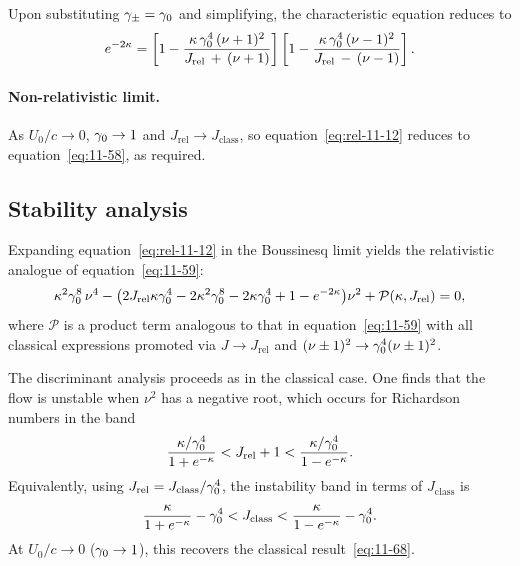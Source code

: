 Upon substituting $\gamma_{\pm}=\gamma_{0}$ and simplifying, the
characteristic equation reduces to
\begin{equation}
\label{eq:rel-11-12}
e^{-2\kappa}
= \left[1
  -\frac{\kappa\,\gamma_{0}^{4}\,(\nu+1)^{2}}
    {J_{\mathrm{rel}}\,+\,(\nu+1)}
\right]
\left[1
  -\frac{\kappa\,\gamma_{0}^{4}\,(\nu-1)^{2}}
    {J_{\mathrm{rel}}\,-\,(\nu-1)}
\right].
\end{equation}

\paragraph{Non-relativistic limit.}
As $U_{0}/c\to 0$, $\gamma_{0}\to 1$ and $J_{\mathrm{rel}}\to
J_{\mathrm{class}}$, so equation~\eqref{eq:rel-11-12} reduces to
equation~\eqref{eq:11-58}, as required.

\subsection{Stability analysis}

Expanding equation~\eqref{eq:rel-11-12} in the Boussinesq limit yields the
relativistic analogue of equation~\eqref{eq:11-59}:
\begin{equation}
\label{eq:rel-11-13}
\kappa^{2}\gamma_{0}^{8}\,\nu^{4}
- \bigl(2J_{\mathrm{rel}}\kappa\gamma_{0}^{4}
  -2\kappa^{2}\gamma_{0}^{8}-2\kappa\gamma_{0}^{4}
  +1-e^{-2\kappa}\bigr)\nu^{2}
+ \mathcal{P}(\kappa,J_{\mathrm{rel}})
= 0,
\end{equation}
where $\mathcal{P}$ is a product term analogous to that in
equation~\eqref{eq:11-59} with all classical expressions promoted via
$J\to J_{\mathrm{rel}}$ and $(\nu\pm 1)^{2}\to\gamma_{0}^{4}(\nu\pm 1)^{2}$.

The discriminant analysis proceeds as in the classical case.  One finds
that the flow is unstable when $\nu^{2}$ has a negative root, which
occurs for Richardson numbers in the band
\begin{equation}
\label{eq:rel-11-14}
\frac{\kappa/\gamma_{0}^{4}}{1+e^{-\kappa}}
< J_{\mathrm{rel}}+1
< \frac{\kappa/\gamma_{0}^{4}}{1-e^{-\kappa}}.
\end{equation}
Equivalently, using $J_{\mathrm{rel}}=J_{\mathrm{class}}/\gamma_{0}^{4}$,
the instability band in terms of $J_{\mathrm{class}}$ is
\begin{equation}
\label{eq:rel-11-15}
\frac{\kappa}{1+e^{-\kappa}} - \gamma_{0}^{4}
< J_{\mathrm{class}}
< \frac{\kappa}{1-e^{-\kappa}} - \gamma_{0}^{4}.
\end{equation}
At $U_{0}/c\to 0$ ($\gamma_{0}\to 1$), this recovers the classical
result~\eqref{eq:11-68}.

